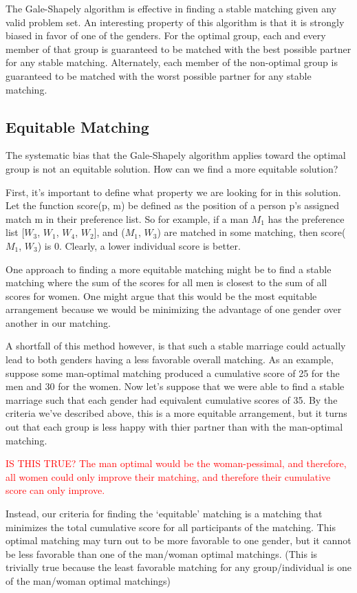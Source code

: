 \documentclass[a4paper]{article}
\begin{document}
The Gale-Shapely algorithm is effective in finding a stable matching given any valid problem set. An interesting property of this algorithm is that it is strongly biased in favor of one of the genders. For the optimal group, each and every member of that group is guaranteed to be matched with the best possible partner for any stable matching. Alternately, each member of the non-optimal group is guaranteed to be matched with the worst possible partner for any stable matching.

\subsection{Equitable Matching}
The systematic bias that the Gale-Shapely algorithm applies toward the optimal group is not an equitable solution. How can we find a more equitable solution?

First, it's important to define what property we are looking for in this solution. Let the function score(p, m) be defined as the position of a person p's assigned match m in their preference list. So for example, if a man $M_1$ has the preference list [$W_3$, $W_1$, $W_4$, $W_2$], and ($M_1$, $W_3$) are matched in some matching, then score($M_1$, $W_3$) is $0$. Clearly, a lower individual score is better.

One approach to finding a more equitable matching might be to find a stable matching where the sum of the scores for all men is closest to the sum of all scores for women. One might argue that this would be the most equitable arrangement because we would be minimizing the advantage of one gender over another in our matching.

A shortfall of this method however, is that such a stable marriage could actually lead to both genders having a less favorable overall matching. As an example, suppose some man-optimal matching produced a cumulative score of 25 for the men and 30 for the women. Now let's suppose that we were able to find a stable marriage such that each gender had equivalent cumulative scores of 35. By the criteria we've described above, this is a more equitable arrangement, but it turns out that each group is less happy with thier partner than with the man-optimal matching.

\textcolor{red}{IS THIS TRUE? The man optimal would be the woman-pessimal, and therefore, all women could only improve their matching, and therefore their cumulative score can only improve.}

Instead, our criteria for finding the `equitable' matching is a matching that minimizes the total cumulative score for all participants of the matching. This optimal matching may turn out to be more favorable to one gender, but it cannot be less favorable than one of the man/woman optimal matchings. (This is trivially true because the least favorable matching for any group/individual is one of the man/woman optimal matchings)
\end{document}
